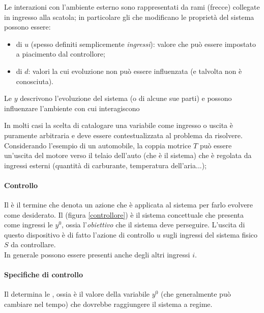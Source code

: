 	
	Le interazioni con l'ambiente esterno sono rappresentati da rami (frecce) collegate in ingresso alla scatola; in particolare gli  che modificano le proprietà del sistema possono essere:
	\begin{itemize}
		\item di  $u$ (spesso definiti semplicemente \textit{ingressi}): valore che può essere impostato a piacimento dal controllore;
		\item di  $d$: valori la cui evoluzione non può essere influenzata (e talvolta non è conosciuta).
	\end{itemize}
	Le  $y$ descrivono l'evoluzione del sistema (o di alcune sue parti) e possono influenzare l'ambiente con cui interagiscono
	
	\vspace{3mm}
	In molti casi la scelta di catalogare una variabile come ingresso o uscita è puramente arbitraria e deve essere contestualizzata al problema da risolvere. Considerando l'esempio di un automobile, la coppia motrice $T$ può essere un'uscita del motore verso il telaio dell'auto (che è il sistema) che è regolata da ingressi esterni (quantità di carburante, temperatura dell'aria...); 
	
	\paragraph{Controllo} Il  è il termine che denota un azione che è applicata al sistema per farlo evolvere come desiderato. Il  (figura \ref{controllore}) è il sistema concettuale che presenta come ingressi le  $y^0$, ossia l'\textit{obiettivo} che il sistema deve perseguire. L'uscita di questo dispositivo è di fatto l'azione di controllo $u$ sugli ingressi del sistema fisico $S$ da controllare. \\ In generale possono essere presenti anche degli altri ingressi $i$.
	
	
	\paragraph{Specifiche di controllo} Il  determina le , ossia è il valore della variabile $y^0$ (che generalmente può cambiare nel tempo) che dovrebbe raggiungere il sistema a regime.
	
